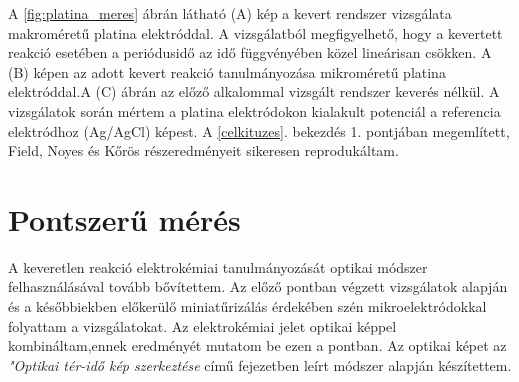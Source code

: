 A \ref{fig:platina_meres} ábrán látható (A) kép a kevert rendszer vizsgálata makroméretű platina elektróddal. A vizsgálatból megfigyelhető, hogy a kevertett reakció esetében a periódusidő az idő függvényében közel lineárisan csökken. A (B) képen az adott kevert reakció tanulmányozása mikroméretű platina elektróddal.A (C) ábrán az előző alkalommal vizsgált rendszer keverés nélkül. A vizsgálatok során mértem a platina elektródokon kialakult potenciál a referencia elektródhoz (Ag/AgCl) képest. A \ref{celkituzes}. bekezdés 1. pontjában megemlített, Field, Noyes és Kőrös részeredményeit \cite{noyes1972oscillations} sikeresen reprodukáltam.  







\section{Pontszerű mérés}
A keveretlen reakció elektrokémiai tanulmányozását optikai módszer felhasználásával tovább bővítettem. Az előző pontban végzett vizsgálatok alapján és a későbbiekben előkerülő miniatűrizálás érdekében szén mikroelektródokkal folyattam a vizsgálatokat. Az elektrokémiai jelet optikai képpel kombináltam,ennek eredményét  mutatom be ezen a pontban. Az optikai képet az \emph{"Optikai tér-idő kép szerkeztése} című fejezetben leírt módszer alapján készítettem.

